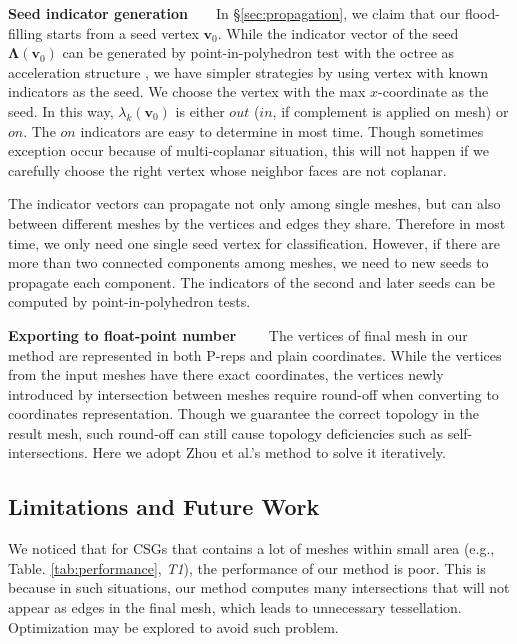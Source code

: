 \documentclass[10pt,journal,compsoc]{IEEEtran}
\begin{document}
\vspace{0.5em}
\noindent\textbf{Seed indicator generation}~~~~In \S\ref{sec:propagation}, we claim that our flood-filling starts from a seed vertex $\bm{v}_0$. While the indicator vector of the seed $\bm{\Lambda}(\bm{v}_0)$ can be generated by point-in-polyhedron test \cite{ogayar2005point} with the octree as acceleration structure \cite{frisken2002simple}, we have simpler strategies by using vertex with known indicators as the seed. We choose the vertex with the max $x$-coordinate as the seed. In this way, $\lambda_k(\bm{v}_0)$ is either $out$ ($in$, if complement is applied on mesh) or $on$. The $on$ indicators are easy to determine in most time. Though sometimes exception occur because of multi-coplanar situation, this will not happen if we carefully choose the right vertex whose neighbor faces are not coplanar.

\vspace{0.5em} The indicator vectors can propagate not only among single meshes, but can also between different meshes by the vertices and edges they share. Therefore in most time, we only need one single seed vertex for classification. However, if there are more than two connected components among meshes, we need to new seeds to propagate each component. The indicators of the second and later seeds can be computed by point-in-polyhedron tests.

\vspace{0.5em}
\noindent\textbf{Exporting to float-point number}~~~~
The vertices of final mesh in our method are represented in both P-reps and plain coordinates. While the vertices from the input meshes have there exact coordinates, the vertices newly introduced by intersection between meshes require round-off when converting to coordinates representation. Though we guarantee the correct topology in the result mesh, such round-off can still cause topology deficiencies such as self-intersections. Here we adopt Zhou et al.'s method \cite{zhou2016mesh} to solve it iteratively.

\subsection{Limitations and Future Work}

We noticed that for CSGs that contains a lot of meshes within small area (e.g., Table. \ref{tab:performance}, \emph{T1}), the performance of our method is poor. This is because in such situations, our method computes many intersections that will not appear as edges in the final mesh, which leads to unnecessary tessellation. Optimization may be explored to avoid such problem.
\end{document}
